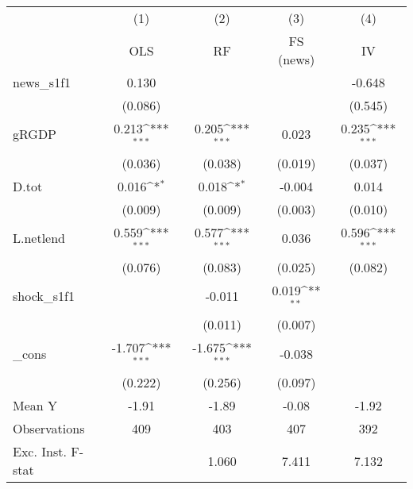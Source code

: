 {
\def\sym#1{\ifmmode^{#1}\else\(^{#1}\)\fi}
\begin{tabular}{l*{4}{c}}
\toprule
            &\multicolumn{1}{c}{(1)}&\multicolumn{1}{c}{(2)}&\multicolumn{1}{c}{(3)}&\multicolumn{1}{c}{(4)}\\
            &\multicolumn{1}{c}{OLS}&\multicolumn{1}{c}{RF}&\multicolumn{1}{c}{FS (news)}&\multicolumn{1}{c}{IV}\\
\midrule
news\_s1f1   &       0.130         &                     &                     &      -0.648         \\
            &     (0.086)         &                     &                     &     (0.545)         \\
\addlinespace
gRGDP       &       0.213\sym{***}&       0.205\sym{***}&       0.023         &       0.235\sym{***}\\
            &     (0.036)         &     (0.038)         &     (0.019)         &     (0.037)         \\
\addlinespace
D.tot       &       0.016\sym{*}  &       0.018\sym{*}  &      -0.004         &       0.014         \\
            &     (0.009)         &     (0.009)         &     (0.003)         &     (0.010)         \\
\addlinespace
L.netlend   &       0.559\sym{***}&       0.577\sym{***}&       0.036         &       0.596\sym{***}\\
            &     (0.076)         &     (0.083)         &     (0.025)         &     (0.082)         \\
\addlinespace
shock\_s1f1  &                     &      -0.011         &       0.019\sym{**} &                     \\
            &                     &     (0.011)         &     (0.007)         &                     \\
\addlinespace
\_cons      &      -1.707\sym{***}&      -1.675\sym{***}&      -0.038         &                     \\
            &     (0.222)         &     (0.256)         &     (0.097)         &                     \\
\midrule
Mean Y      &       -1.91         &       -1.89         &       -0.08         &       -1.92         \\
Observations&         409         &         403         &         407         &         392         \\
Exc. Inst. F-stat&                     &       1.060         &       7.411         &       7.132         \\
\bottomrule
\end{tabular}
}
